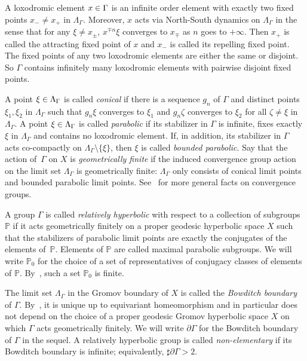\documentclass[10pt,a4paper]{amsart}
\newcommand{\bbP}{\mathbb{P}}
\let\oldin\in
\renewcommand{\in}{\mathchoice{\oldin}{\oldin}{\,\oldin\,}{\,\oldin\,}}
\theoremstyle{definition}\newtheorem{defi}[theo]{Definition}
\begin{document}
A loxodromic element $x\in \Gamma$ is an infinite order element with exactly two fixed points $x_-\ne x_+$ in $\Lambda_\Gamma$. Moreover, $x$ acts via North-South dynamics on $\Lambda_\Gamma$ in the sense that for any $\xi\neq x_{\pm}$, $x^{\mp n}\xi$ converges to $x_{\mp}$ as $n$ goes to $+\infty$. Then $x_+$ is called the attracting fixed point of $x$ and $x_-$ is called its repelling fixed point. The fixed points of any two loxodromic elements are either the same or disjoint. So $\Gamma$ contains infinitely many loxodromic elements with pairwise disjoint fixed points.


A point $\xi\in \Lambda_\Gamma$ is called \emph{conical} if there is a sequence $g_{n}$ of $\Gamma$ and distinct points $\xi_1,\xi_2$ in $\Lambda_\Gamma$ such that $g_{n}\xi$ converges to $\xi_1$ and $g_{n}\zeta$ converges to $\xi_2$ for all $\zeta\neq \xi$ in~$\Lambda_\Gamma$. A point $\xi\in \Lambda_\Gamma$ is called \emph{parabolic} if its stabilizer in $\Gamma$ is infinite, fixes exactly $\xi$ in $\Lambda_\Gamma$ and contains no loxodromic element. If, in addition, its stabilizer in $\Gamma$ acts co-compactly on $\Lambda_\Gamma \setminus \{\xi\}$, then $\xi$ is called \emph{bounded parabolic}. Say that the action of~$\Gamma$ on $X$ is \emph{geometrically finite} if the induced convergence group action on the limit set $\Lambda_
\Gamma$ is geometrically finite: $\Lambda_
\Gamma$ only consists of conical limit points and bounded parabolic limit points. See~\cite{Bo99} for more general facts on convergence groups.


A group $\Gamma$ is called \emph{relatively hyperbolic} with respect to a collection of subgroups~$\bbP$ if it acts geometrically finitely on a proper geodesic hyperbolic space $X$ such that the stabilizers of parabolic limit points are exactly the conjugates of the elements of~$\bbP$. Elements of $\bbP$ are called maximal parabolic subgroups. We will write $\bbP_0$ for the choice of a set of representatives of conjugacy classes of elements of $\bbP$. By~\cite[Proposition~6.15]{Bowditch}, such a set $\bbP_0$ is finite.

The limit set $\Lambda_\Gamma$ in the Gromov boundary of $X$ is called the \emph{Bowditch boundary} of $\Gamma$. By~\cite[Theorem~9.4]{Bowditch}, it is unique up to equivariant homeomorphism and in particular does not depend on the choice of a proper geodesic Gromov hyperbolic space $X$ on which $\Gamma$ acts geometrically finitely. We will write $\partial\Gamma$ for the Bowditch boundary of $\Gamma$ in the sequel. A relatively hyperbolic group is called \emph{non-elementary} if its Bowditch boundary is infinite; equivalently, $\sharp \partial\Gamma>2$.
\end{document}
